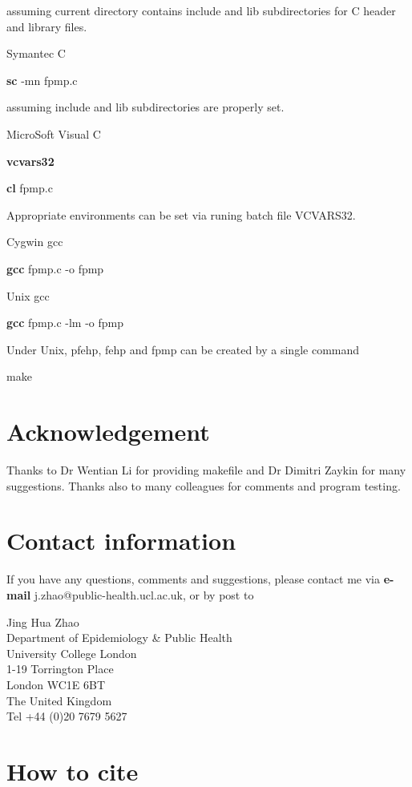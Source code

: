 \documentclass[11pt]{article}
\begin{document}
assuming current directory contains include and lib subdirectories for C header
and library files.

\medskip
Symantec C

\medskip
{\bf sc} -mn fpmp.c

\medskip
assuming include and lib subdirectories are properly set.

\medskip
MicroSoft Visual C

\medskip
{\bf vcvars32}

{\bf cl} fpmp.c

\medskip
Appropriate environments can be set via runing batch file VCVARS32.

\medskip
Cygwin gcc
\medskip

{\bf gcc} fpmp.c -o fpmp

\medskip
Unix gcc

\medskip
{\bf gcc} fpmp.c -lm -o fpmp

\medskip
Under Unix, pfehp, fehp and fpmp can be created by a single command

\medskip
make


\section{Acknowledgement}

Thanks to Dr Wentian Li for providing makefile and Dr Dimitri Zaykin for
many suggestions.  Thanks also to many colleagues for comments and program
testing.


\newpage\section{Contact information}

If you have any questions, comments and suggestions, please contact me
via {\bf e-mail} j.zhao@public-health.ucl.ac.uk, or by post to

\medskip\noindent
Jing Hua Zhao\\
Department of Epidemiology \& Public Health\\
University College London\\
1-19 Torrington Place\\
London WC1E 6BT\\
The United Kingdom\\
Tel +44 (0)20 7679 5627


\section{How to cite}
\end{document}
